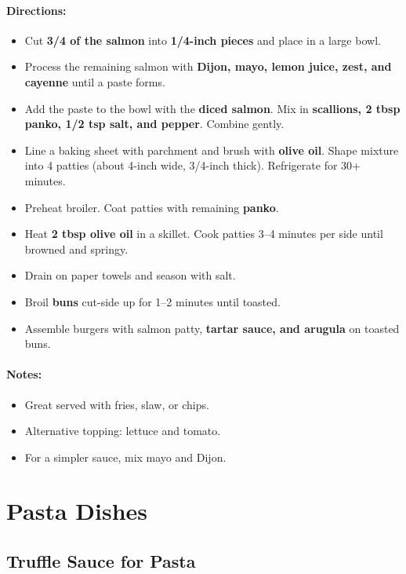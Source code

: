 \documentclass{article}
\begin{document}
\paragraph{Directions:}
\begin{itemize}
    \item Cut \textbf{3/4 of the salmon} into \textbf{1/4-inch pieces} and place in a large bowl.
    \item Process the remaining salmon with \textbf{Dijon, mayo, lemon juice, zest, and cayenne} until a paste forms.
    \item Add the paste to the bowl with the \textbf{diced salmon}. Mix in \textbf{scallions, 2 tbsp panko, 1/2 tsp salt, and pepper}. Combine gently.
    \item Line a baking sheet with parchment and brush with \textbf{olive oil}. Shape mixture into 4 patties (about 4-inch wide, 3/4-inch thick). Refrigerate for 30+ minutes.
    \item Preheat broiler. Coat patties with remaining \textbf{panko}.
    \item Heat \textbf{2 tbsp olive oil} in a skillet. Cook patties 3–4 minutes per side until browned and springy.
    \item Drain on paper towels and season with salt.
    \item Broil \textbf{buns} cut-side up for 1–2 minutes until toasted.
    \item Assemble burgers with salmon patty, \textbf{tartar sauce, and arugula} on toasted buns.
\end{itemize}

\paragraph{Notes:}
\begin{itemize}
    \item Great served with fries, slaw, or chips.
    \item Alternative topping: lettuce and tomato.
    \item For a simpler sauce, mix mayo and Dijon.
\end{itemize}

\section{Pasta Dishes}


\subsection{Truffle Sauce for Pasta}
\end{document}
